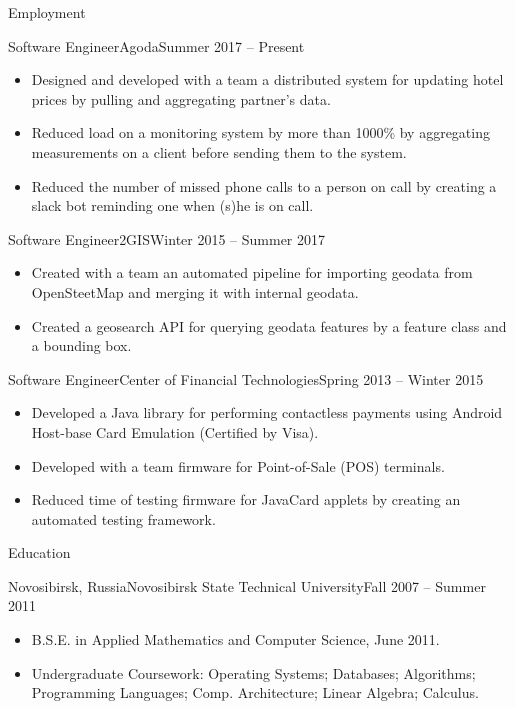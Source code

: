 \documentclass[]{cv}
\begin{document}
	\makeheader

	\begin{cvsection}{Employment}
		\begin{cvsubsection}{Software Engineer}{Agoda}{Summer 2017 -- Present}
			\begin{itemize}
				\item Designed and developed with a team a distributed system for updating hotel prices by pulling and aggregating partner's data.
				\item Reduced load on a monitoring system by more than 1000\% by aggregating measurements on a client before sending them to the system.
        \item Reduced the number of missed phone calls to a person on call by creating a slack bot reminding one when (s)he is on call.
			\end{itemize}
		\end{cvsubsection}

		\begin{cvsubsection}{Software Engineer}{2GIS}{Winter 2015 -- Summer 2017}
			\begin{itemize}
				\item Created with a team an automated pipeline for importing geodata from OpenSteetMap and merging it with internal geodata.
				\item Created a geosearch API for querying geodata features by a feature class and a bounding box.
			\end{itemize}
		\end{cvsubsection}

		\begin{cvsubsection}{Software Engineer}{Center of Financial Technologies}{Spring 2013 -- Winter 2015}
			\begin{itemize}
        \item Developed a Java library for performing contactless payments using Android Host-base Card Emulation (Certified by Visa).
        \item Developed with a team firmware for Point-of-Sale (POS) terminals.
        \item Reduced time of testing firmware for JavaCard applets by creating an automated testing framework.
			\end{itemize}
		\end{cvsubsection}

	\end{cvsection}

	\begin{cvsection}{Education}
		\begin{cvsubsection}{Novosibirsk, Russia}{Novosibirsk State Technical University}{Fall 2007 -- Summer 2011}
			\begin{itemize}
				\item B.S.E. in Applied Mathematics and Computer Science, June 2011.
				\item Undergraduate Coursework: Operating Systems; Databases; Algorithms; Programming Languages; Comp. Architecture; Linear Algebra; Calculus.
			\end{itemize}
		\end{cvsubsection}
	\end{cvsection}
\end{document}
